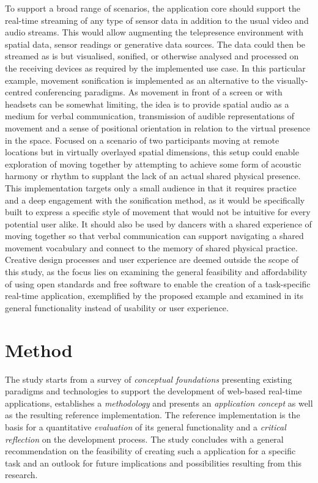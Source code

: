 To support a broad range of scenarios, the application core should support the real-time streaming of any type of sensor data in addition to the usual video and audio streams.
This would allow augmenting the telepresence environment with spatial data, sensor readings or generative data sources.
The data could then be streamed as is but visualised, sonified, or otherwise analysed and processed on the receiving devices as required by the implemented use case.
In this particular example, movement sonification is implemented as an alternative to the visually-centred conferencing paradigms.
As movement in front of a screen or with headsets can be somewhat limiting, the idea is to provide spatial audio as a medium for verbal communication, transmission of audible representations of movement and a sense of positional orientation in relation to the virtual presence in the space.
Focused on a scenario of two participants moving at remote locations but in virtually overlayed spatial dimensions, this setup could enable exploration of moving together by attempting to achieve some form of acoustic harmony or rhythm to supplant the lack of an actual shared physical presence.
This implementation targets only a small audience in that it requires practice and a deep engagement with the sonification method, as it would be specifically built to express a specific style of movement that would not be intuitive for every potential user alike.
It should also be used by dancers with a shared experience of moving together so that verbal communication can support navigating a shared movement vocabulary and connect to the memory of shared physical practice.
Creative design processes and user experience are deemed outside the scope of this study, as the focus lies on examining the general feasibility and affordability of using open standards and free software to enable the creation of a task-specific real-time application, exemplified by the proposed example and examined in its general functionality instead of usability or user experience.

\section{Method}
\label{sec:method}

The study starts from a survey of \emph{conceptual foundations} presenting existing paradigms and technologies to support the development of web-based real-time applications, establishes a \emph{methodology} and presents an \emph{application concept} as well as the resulting {reference implementation}.
The reference implementation is the basis for a quantitative \emph{evaluation} of its general functionality and a \emph{critical reflection} on the development process.
The study concludes with a general recommendation on the feasibility of creating such a  application for a specific task and an outlook for future implications and possibilities resulting from this research.
